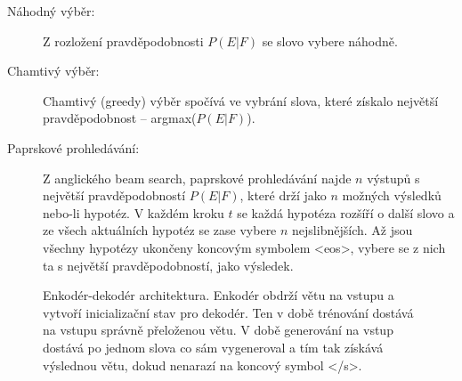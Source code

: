 \begin{description}
  \item[Náhodný výběr:] Z rozložení pravděpodobnosti $P(E|F)$ se slovo vybere náhodně.
  \item[Chamtivý výběr:] Chamtivý (greedy) výběr spočívá ve vybrání slova, které získalo největší pravděpodobnost -- argmax($P(E|F)$).
  \item[Paprskové prohledávání:]\label{decsription:beamsearch} Z anglického beam search, paprskové prohledávání najde $n$ výstupů s největší pravděpodobností $P(E|F)$, které drží jako $n$ možných výsledků nebo-li hypotéz. V každém kroku $t$ se každá hypotéza rozšíří o další slovo a ze všech aktuálních hypotéz se zase vybere $n$ nejslibnějších. Až jsou všechny hypotézy ukončeny koncovým symbolem <eos>, vybere se z nich ta s největší pravděpodobností, jako výsledek.
\end{description}


\begin{figure}[H]
    \begin{center}
    \end{center}
	\caption{Enkodér-dekodér architektura. Enkodér obdrží větu na vstupu a vytvoří inicializační stav pro dekodér. Ten v době trénování dostává na vstupu správně přeloženou větu. V době generování na vstup dostává po jednom slova co sám vygeneroval a tím tak získává výslednou větu, dokud nenarazí na koncový symbol </s>. }
	\label{img:seq2seq}
\end{figure}

